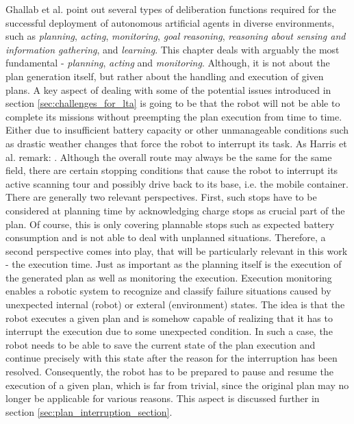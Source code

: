 \documentclass[english, master, utf8]{base/thesis_KBS}
\begin{document}
Ghallab et al. point out several types of deliberation functions required for the successful deployment of autonomous artificial agents in diverse environments,
such as \textit{planning}, \textit{acting}, \textit{monitoring}, \textit{goal reasoning}, \textit{reasoning about sensing and information gathering}, and \textit{learning}. \cite{GNT:2016} This chapter deals with arguably the most
fundamental - \textit{planning}, \textit{acting} and \textit{monitoring}. Although, it is not about the plan generation itself, but rather about the handling and execution of given plans.
A key aspect of dealing with some of the potential issues introduced in section \ref{sec:challenges_for_lta} is going to be that the robot will not be able to
complete its missions without preempting the plan execution from time to time. Either due to insufficient battery capacity or other unmanageable conditions such as 
drastic weather changes that force the robot to interrupt its task. As Harris et al. remark: . \cite{Harris:2021} Although the overall route may always be the same for the same field, there are certain stopping
conditions that cause the robot to interrupt its active scanning tour and possibly drive back to its base, i.e. the mobile container.
There are generally two relevant perspectives. First, such stops have to be considered at planning time by acknowledging charge stops as crucial part of the plan.
Of course, this is only covering plannable stops such as expected battery consumption and is not able to deal with unplanned situations.
Therefore, a second perspective comes into play, that will be particularly relevant in this work - the execution time.
Just as important as the planning itself is the execution of the generated plan as well as monitoring the execution. Execution monitoring enables a robotic system to
recognize and classify failure situations caused by unexpected internal (robot) or exteral (environment) states. \cite{Pettersson:2005}
The idea is that the robot executes a given plan and is somehow capable of realizing that it has to interrupt the execution due to some unexpected condition.
In such a case, the robot needs to be able to save the current state of the plan execution and continue precisely with this state after the reason 
for the interruption has been resolved. Consequently, the robot has to be prepared to pause and resume the execution of a given plan, which is far from 
trivial, since the original plan may no longer be applicable for various reasons. This aspect is discussed further in section \ref{sec:plan_interruption_section}.
\end{document}
